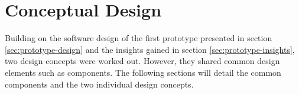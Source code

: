 \chapter{Conceptual Design}
\label{chap:conceptual-design}

Building on the software design of the first prototype presented in section \ref{sec:prototype-design} and the insights gained in section \ref{sec:prototype-insights}, two design concepts were worked out. However, they shared common design elements such as components. The following sections will detail the common components and the two individual design concepts.

